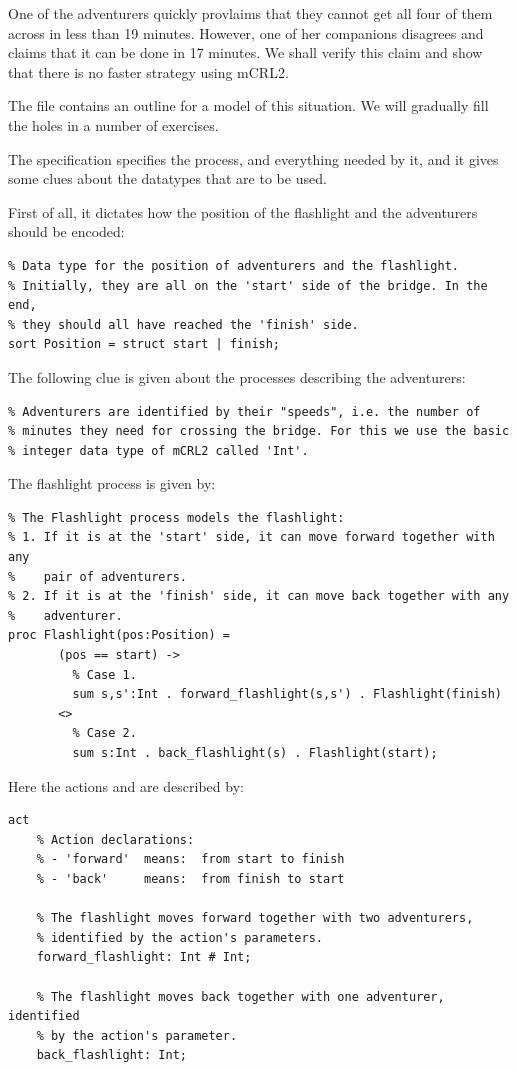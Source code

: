 \documentclass[11pt]{article}
\theoremstyle{myplain}
\theoremstyle{definition} %
\begin{document}
One of the adventurers quickly provlaims that they cannot get all four of them across in less than 19 minutes. However, one of her companions disagrees and claims that it can be done in 17 minutes. We shall verify this claim and show that there is no faster strategy using mCRL2.

The file  contains an outline for a model of this situation. We will gradually fill the holes in a number of exercises.

The specification specifies the  process, and everything needed by it, and it gives some clues about the datatypes that are to be used.

First of all, it dictates how the position of the flashlight and the adventurers should be encoded:

\begin{lstlisting}
% Data type for the position of adventurers and the flashlight.
% Initially, they are all on the 'start' side of the bridge. In the end,
% they should all have reached the 'finish' side.
sort Position = struct start | finish;
\end{lstlisting}

The following clue is given about the processes describing the adventurers:

\begin{lstlisting}
% Adventurers are identified by their "speeds", i.e. the number of
% minutes they need for crossing the bridge. For this we use the basic
% integer data type of mCRL2 called 'Int'.
\end{lstlisting}

The flashlight process is given by:

\begin{lstlisting}
% The Flashlight process models the flashlight:
% 1. If it is at the 'start' side, it can move forward together with any
%    pair of adventurers.
% 2. If it is at the 'finish' side, it can move back together with any
%    adventurer.
proc Flashlight(pos:Position) =
       (pos == start) ->
         % Case 1.
         sum s,s':Int . forward_flashlight(s,s') . Flashlight(finish)
       <> 
         % Case 2.
         sum s:Int . back_flashlight(s) . Flashlight(start);
\end{lstlisting}

Here the actions  and  are described by:

\begin{lstlisting}
act
    % Action declarations:
    % - 'forward'  means:  from start to finish
    % - 'back'     means:  from finish to start

    % The flashlight moves forward together with two adventurers,
    % identified by the action's parameters.
    forward_flashlight: Int # Int;

    % The flashlight moves back together with one adventurer, identified
    % by the action's parameter.
    back_flashlight: Int;
\end{lstlisting}
\end{document}
